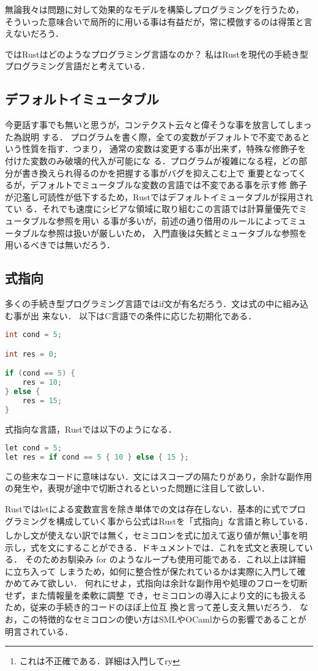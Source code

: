 無論我々は問題に対して効果的なモデルを構築しプログラミングを行うため，
そういった意味合いで局所的に用いる事は有益だが，常に模倣するのは得策と言えないだろう．

ではRustはどのようなプログラミング言語なのか？
私はRustを現代の手続き型プログラミング言語だと考えている．

\subsection{デフォルトイミュータブル}
今更話す事でも無いと思うが，コンテクスト云々と偉そうな事を放言してしまった為説明
する．
プログラムを書く際，全ての変数がデフォルトで不変であるという性質を指す．つまり，
通常の変数は変更する事が出来ず，特殊な修飾子を付けた変数のみ破壊的代入が可能にな
る．プログラムが複雑になる程，どの部分が書き換えられ得るのかを把握する事がバグを抑えこむ上で
重要となってくるが，デフォルトでミュータブルな変数の言語では不変である事を示す修
飾子が氾濫し可読性が低下するため，Rustではデフォルトイミュータブルが採用されてい
る．それでも速度にシビアな領域に取り組むこの言語では計算量優先でミュータブルな参照を用い
る事が多いが，前述の通り借用のルールによってミュータブルな参照は扱いが厳しいため，
入門直後は矢鱈とミュータブルな参照を用いるべきでは無いだろう．

\subsection{式指向}
多くの手続き型プログラミング言語ではif文が有名だろう．文は式の中に組み込む事が出
来ない．
以下はC言語での条件に応じた初期化である．

\begin{lstlisting}[language={C},caption=Cにおけるif文,label=c_if]
int cond = 5;

int res = 0;

if (cond == 5) {
    res = 10;
} else {
    res = 15;
}
\end{lstlisting}

式指向な言語，Rustでは以下のようになる．

\begin{lstlisting}[language={C++},caption=Rustにおけるif式,label=rust_if]
let cond = 5;
let res = if cond == 5 { 10 } else { 15 };
\end{lstlisting}

この些末なコードに意味はない．文にはスコープの隔たりがあり，余計な副作用の発生や，表現が途中で切断されるといった問題に注目して欲しい．

Rustではletによる変数宣言を除き単体での文は存在しない．基本的に式でプログラミングを構成していく事から公式はRustを「式指向」な言語と称している．
しかし文が使えない訳では無く，セミコロンを式に加えて返り値が無い\footnote{これは不正確である．詳細は入門してry}事を明示し，式を文にすることができる．ドキュメントでは．これを式文と表現している．
そのためお馴染み for のようなループも使用可能である．これ以上は詳細に立ち入って
しまうため，如何に整合性が保たれているかは実際に入門して確かめてみて欲しい．
何れにせよ，式指向は余計な副作用や処理のフローを切断せず，また情報量を柔軟に調整
でき，セミコロンの導入により文的にも扱えるため，従来の手続き的コードのほぼ上位互
換と言って差し支え無いだろう．
なお，この特徴的なセミコロンの使い方はSMLやOCamlからの影響であることが明言されている．\cite{inf}

